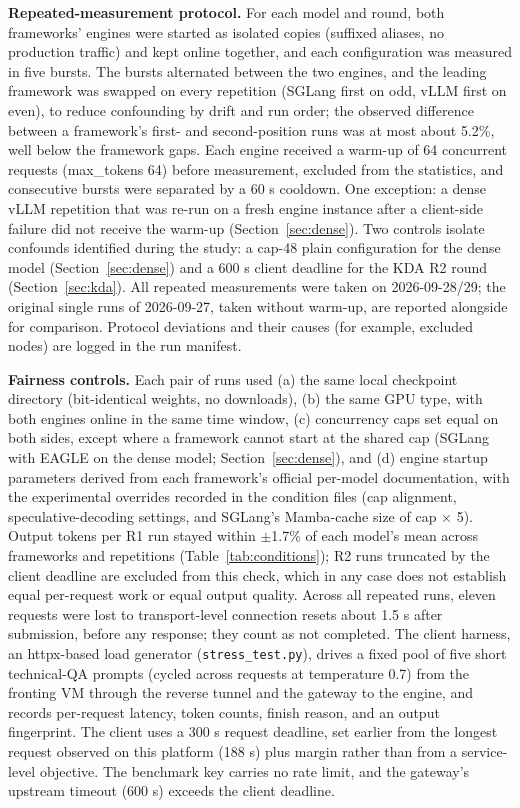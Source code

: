 \documentclass[11pt]{article}
\begin{document}
\textbf{Repeated-measurement protocol.} For each model and round, both frameworks' engines were started as isolated copies (suffixed aliases, no production traffic) and kept online together, and each configuration was measured in five bursts. The bursts alternated between the two engines, and the leading framework was swapped on every repetition (SGLang first on odd, vLLM first on even), to reduce confounding by drift and run order; the observed difference between a framework's first- and second-position runs was at most about 5.2\%, well below the framework gaps. Each engine received a warm-up of 64 concurrent requests (max\_tokens 64) before measurement, excluded from the statistics, and consecutive bursts were separated by a 60 s cooldown. One exception: a dense vLLM repetition that was re-run on a fresh engine instance after a client-side failure did not receive the warm-up (Section~\ref{sec:dense}). Two controls isolate confounds identified during the study: a cap-48 plain configuration for the dense model (Section~\ref{sec:dense}) and a 600 s client deadline for the KDA R2 round (Section~\ref{sec:kda}). All repeated measurements were taken on 2026-09-28/29; the original single runs of 2026-09-27, taken without warm-up, are reported alongside for comparison. Protocol deviations and their causes (for example, excluded nodes) are logged in the run manifest.

\textbf{Fairness controls.} Each pair of runs used (a) the same local checkpoint directory (bit-identical weights, no downloads), (b) the same GPU type, with both engines online in the same time window, (c) concurrency caps set equal on both sides, except where a framework cannot start at the shared cap (SGLang with EAGLE on the dense model; Section~\ref{sec:dense}), and (d) engine startup parameters derived from each framework's official per-model documentation, with the experimental overrides recorded in the condition files (cap alignment, speculative-decoding settings, and SGLang's Mamba-cache size of cap $\times$ 5). Output tokens per R1 run stayed within $\pm$1.7\% of each model's mean across frameworks and repetitions (Table~\ref{tab:conditions}); R2 runs truncated by the client deadline are excluded from this check, which in any case does not establish equal per-request work or equal output quality. Across all repeated runs, eleven requests were lost to transport-level connection resets about 1.5 s after submission, before any response; they count as not completed. The client harness, an httpx-based load generator (\texttt{stress\_test.py}), drives a fixed pool of five short technical-QA prompts (cycled across requests at temperature 0.7) from the fronting VM through the reverse tunnel and the gateway to the engine, and records per-request latency, token counts, finish reason, and an output fingerprint. The client uses a 300 s request deadline, set earlier from the longest request observed on this platform (188 s) plus margin rather than from a service-level objective. The benchmark key carries no rate limit, and the gateway's upstream timeout (600 s) exceeds the client deadline.
\end{document}
